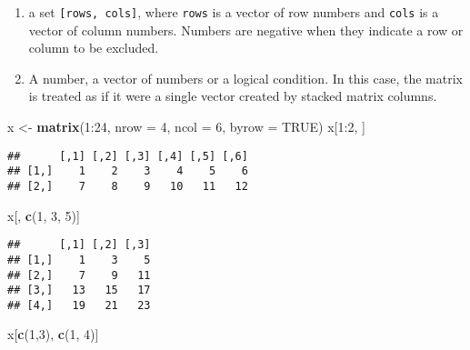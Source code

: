 \documentclass[]{book}
\newenvironment{Shaded}{\begin{snugshade}}{\end{snugshade}}
\newcommand{\KeywordTok}[1]{\textcolor[rgb]{0.13,0.29,0.53}{\textbf{{#1}}}}
\newcommand{\DataTypeTok}[1]{\textcolor[rgb]{0.13,0.29,0.53}{{#1}}}
\newcommand{\DecValTok}[1]{\textcolor[rgb]{0.00,0.00,0.81}{{#1}}}
\newcommand{\StringTok}[1]{\textcolor[rgb]{0.31,0.60,0.02}{{#1}}}
\newcommand{\OtherTok}[1]{\textcolor[rgb]{0.56,0.35,0.01}{{#1}}}
\newcommand{\NormalTok}[1]{{#1}}
\providecommand{\tightlist}{%
  \setlength{\itemsep}{0pt}\setlength{\parskip}{0pt}}
\def\tightlist{}
\begin{document}
\begin{enumerate}
\def\labelenumi{\arabic{enumi}.}
\tightlist
\item
  a set \texttt{{[}rows,\ cols{]}}, where \texttt{rows} is a vector of
  row numbers and \texttt{cols} is a vector of column numbers. Numbers
  are negative when they indicate a row or column to be excluded.
\item
  A number, a vector of numbers or a logical condition. In this case,
  the matrix is treated as if it were a single vector created by stacked
  matrix columns.
\end{enumerate}

\begin{Shaded}
\begin{Highlighting}[]
\NormalTok{x <-}\StringTok{ }\KeywordTok{matrix}\NormalTok{(}\DecValTok{1}\NormalTok{:}\DecValTok{24}\NormalTok{, }\DataTypeTok{nrow =} \DecValTok{4}\NormalTok{, }\DataTypeTok{ncol =} \DecValTok{6}\NormalTok{, }\DataTypeTok{byrow =} \OtherTok{TRUE}\NormalTok{)}
\NormalTok{x[}\DecValTok{1}\NormalTok{:}\DecValTok{2}\NormalTok{, ]}
\end{Highlighting}
\end{Shaded}

\begin{verbatim}
##      [,1] [,2] [,3] [,4] [,5] [,6]
## [1,]    1    2    3    4    5    6
## [2,]    7    8    9   10   11   12
\end{verbatim}

\begin{Shaded}
\begin{Highlighting}[]
\NormalTok{x[, }\KeywordTok{c}\NormalTok{(}\DecValTok{1}\NormalTok{, }\DecValTok{3}\NormalTok{, }\DecValTok{5}\NormalTok{)]}
\end{Highlighting}
\end{Shaded}

\begin{verbatim}
##      [,1] [,2] [,3]
## [1,]    1    3    5
## [2,]    7    9   11
## [3,]   13   15   17
## [4,]   19   21   23
\end{verbatim}

\begin{Shaded}
\begin{Highlighting}[]
\NormalTok{x[}\KeywordTok{c}\NormalTok{(}\DecValTok{1}\NormalTok{,}\DecValTok{3}\NormalTok{), }\KeywordTok{c}\NormalTok{(}\DecValTok{1}\NormalTok{, }\DecValTok{4}\NormalTok{)]}
\end{Highlighting}
\end{Shaded}
\end{document}
